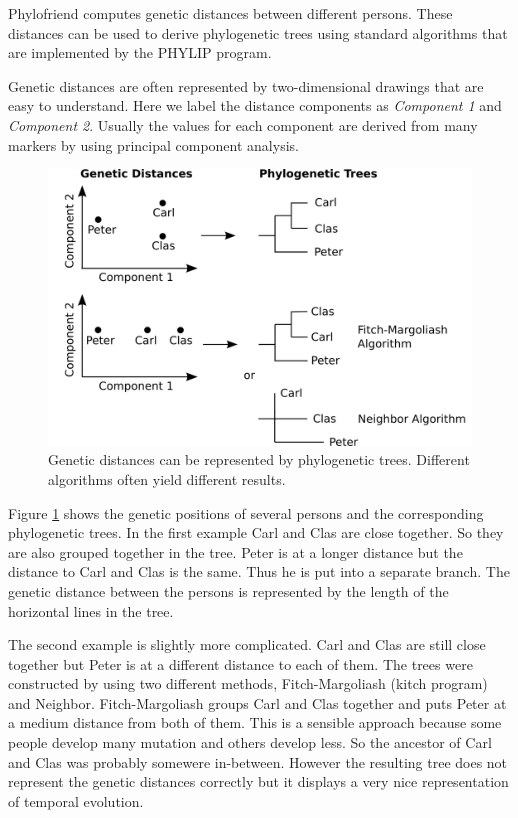 Phylofriend computes genetic distances between different
persons. These distances can be used to derive phylogenetic
trees using standard algorithms that are implemented by
the PHYLIP\cite{Phylip} program.

Genetic distances are often represented by two-dimensional
drawings that are easy to understand. Here we label the
distance components as \emph{Component 1} and 
\emph{Component 2}. Usually the values for each component
are derived from many markers by using principal component
analysis\cite{Shl09}.

\begin{figure}[ht]
\centering
\includegraphics[width=13cm]{img/distancetrees.png}
\caption{\label{distancetrees} Genetic distances can be
represented by phylogenetic trees. Different algorithms
often yield different results.}
\end{figure}

Figure \ref{distancetrees} shows the genetic positions of
several persons and the corresponding phylogenetic trees.
In the first example Carl and Clas are close together. So
they are also grouped together in the tree. Peter is at a
longer distance but the distance to Carl and Clas is the
same. Thus he is put into a separate branch. The genetic
distance between the persons is represented by the length
of the horizontal lines in the tree.

The second example is slightly more complicated. Carl and
Clas are still close together but Peter is at a different
distance to each of them. The trees were constructed by
using two different methods, Fitch-Margoliash (kitch program)
and Neighbor. Fitch-Margoliash groups Carl and Clas together
and puts Peter at a medium distance from both of them. This
is a sensible approach because some people develop many
mutation and others develop less. So the ancestor of Carl and
Clas was probably somewere in-between. However the resulting
tree does not represent the genetic distances correctly but
it displays a very nice representation of temporal evolution.

